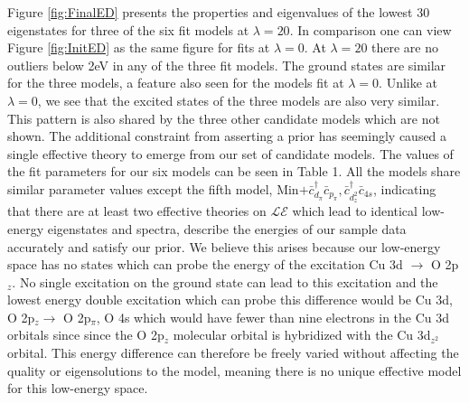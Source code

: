 \documentclass{article}
\begin{document}
Figure \ref{fig:FinalED} presents the properties and eigenvalues of the lowest 30 eigenstates for three of the six fit models at $\lambda = 20$. 
In comparison one can view Figure \ref{fig:InitED} as the same figure for fits at $\lambda = 0$. 
At $\lambda = 20$ there are no outliers below 2eV in any of the three fit models. 
The ground states are similar for the three models, a feature also seen for the models fit at $\lambda = 0$.
Unlike at $\lambda = 0$, we see that the excited states of the three models are also very similar.
This pattern is also shared by the three other candidate models which are not shown. 
The additional constraint from asserting a prior has seemingly caused a single effective theory to emerge from our set of candidate models.
The values of the fit parameters for our six models can be seen in Table 1.
All the models share similar parameter values except the fifth model, Min$ + \bar{c}_{d_\pi}^\dagger \bar{c}_{p_\pi}, \bar{c}_{d_z^2}^\dagger \bar{c}_{4s}$, indicating that there are at least two effective theories on $\mathcal{LE}$ which lead to identical low-energy eigenstates and spectra, describe the energies of our sample data accurately and satisfy our prior.
We believe this arises because our low-energy space has no states which can probe the energy of the excitation Cu 3d $\rightarrow$ O 2p$_z$. 
No single excitation on the ground state can lead to this excitation and the lowest energy double excitation which can probe this difference would be Cu 3d, O 2p$_z \rightarrow$ O 2p$_\pi$, O 4s which would have fewer than nine electrons in the Cu 3d orbitals since since the O 2p$_z$ molecular orbital is hybridized with the Cu 3d$_{z^2}$ orbital.
This energy difference can therefore be freely varied without affecting the quality or eigensolutions to the model, meaning there is no unique effective model for this low-energy space.
\end{document}
